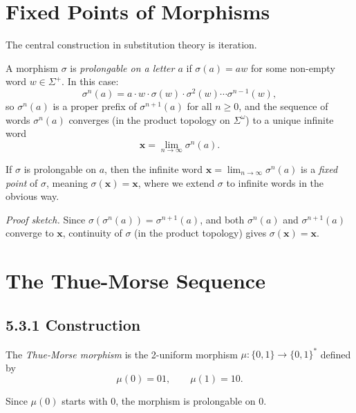 \section{Fixed Points of Morphisms}

The central construction in substitution theory is iteration.

\begin{definition}
A morphism $\sigma$ is \textit{prolongable on a letter $a$} if $\sigma(a) = aw$ for some non-empty word $w \in \Sigma^+$. In this case:
\[\sigma^n(a) = a \cdot w \cdot \sigma(w) \cdot \sigma^2(w) \cdots \sigma^{n-1}(w),\]
so $\sigma^n(a)$ is a proper prefix of $\sigma^{n+1}(a)$ for all $n \geq 0$, and the sequence of words $\sigma^n(a)$ converges (in the product topology on $\Sigma^\omega$) to a unique infinite word
\[\mathbf{x} = \lim_{n \to \infty} \sigma^n(a).\]
\end{definition}

\begin{theorem}
If $\sigma$ is prolongable on $a$, then the infinite word $\mathbf{x} = \lim_{n \to \infty} \sigma^n(a)$ is a \textit{fixed point} of $\sigma$, meaning $\sigma(\mathbf{x}) = \mathbf{x}$, where we extend $\sigma$ to infinite words in the obvious way.

\textit{Proof sketch.} Since $\sigma(\sigma^n(a)) = \sigma^{n+1}(a)$, and both $\sigma^n(a)$ and $\sigma^{n+1}(a)$ converge to $\mathbf{x}$, continuity of $\sigma$ (in the product topology) gives $\sigma(\mathbf{x}) = \mathbf{x}$. 



\end{theorem}


\section{The Thue-Morse Sequence}

\subsection{5.3.1 Construction}

\begin{definition}
The \textit{Thue-Morse morphism} is the 2-uniform morphism $\mu: \{ 0,1\}  \to \{ 0,1\} ^*$ defined by
\[\mu(0) = 01, \qquad \mu(1) = 10.\]

Since $\mu(0)$ starts with $0$, the morphism is prolongable on $0$.
\end{definition}

